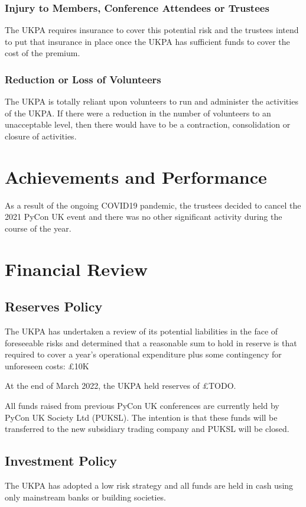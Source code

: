 \documentclass[11pt, final]{article}
\begin{document}
            \subsubsection{Injury to Members, Conference Attendees or Trustees}
            The UKPA requires insurance to cover this potential risk and the trustees intend to put that insurance in place once the UKPA has sufficient funds to cover the cost of the premium.

            \subsubsection{Reduction or Loss of Volunteers}
            The UKPA is totally reliant upon volunteers to run and administer the activities of the UKPA. If there were a reduction in the number of volunteers to an unacceptable level, then there would have to be a contraction, consolidation or closure of activities.

    \section{Achievements and Performance}
    	As a result of the ongoing COVID19 pandemic, the trustees decided to cancel the 2021 PyCon UK event and there was no other significant activity during the course of the year.
    \section{Financial Review}

        \subsection{Reserves Policy}
		The UKPA has undertaken a review of its potential liabilities in the face of foreseeable risks and determined that a reasonable sum to hold in reserve is that required to cover a year's operational expenditure plus some contingency for unforeseen costs: \pounds10K

        At the end of March 2022, the UKPA held reserves of \pounds TODO.

        All funds raised from previous PyCon UK conferences are currently held by PyCon UK Society Ltd (PUKSL). The intention is that these funds will be transferred to the new subsidiary trading company  and PUKSL will be closed.

        \subsection{Investment Policy}
        The UKPA has adopted a low risk strategy and all funds are held in cash using only mainstream banks or building societies.
\end{document}
